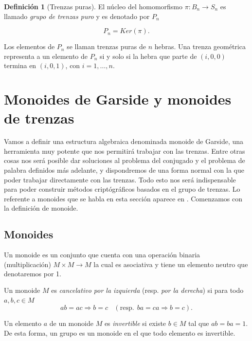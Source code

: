 \documentclass[12pt]{article}
\theoremstyle{definition}
\newtheorem{defi}{Definición}[section]
\begin{document}
\begin{defi}[Trenzas puras]
El núcleo del homomorfismo $\pi:B_n\rightarrow S_n$ es llamado \textit{grupo de trenzas puro} y es denotado por $P_n$

$$P_n = Ker(\pi).$$

Los elementos de $P_n$ se llaman trenzas puras de $n$ hebras. Una trenza geométrica representa a un elemento de $P_n$ si y solo si la hebra que parte de $(i,0,0)$ termina en $(i,0,1)$, con $i = 1,\ldots,n$.

\end{defi}


















\section{Monoides de Garside y monoides de trenzas}

Vamos a definir una estructura algebraica denominada monoide de Garside, una herramienta muy potente que nos permitirá trabajar con las trenzas. Entre otras cosas nos será posible dar soluciones al problema del conjugado y el problema de palabra definidos más adelante, y dispondremos de una forma normal con la que poder trabajar directamente con las trenzas. Todo esto nos será indispensable para poder construir métodos criptógráficos basados en el grupo de trenzas. Lo referente a monoides que se habla en esta sección aparece en \cite{br_gr}. Comenzamos con la definición de monoide.

\subsection{Monoides}

Un monoide es un conjunto que cuenta con una operación binaria (multiplicación) $M\times M \rightarrow M$ la cual es asociativa y tiene un elemento neutro que denotaremos por 1. 

Un monoide $M$ es \textit{cancelativo por la izquierda} (resp. \textit{por la derecha}) si para todo $a,b,c\in M$
$$ab=ac\Longrightarrow b=c\ \ \ \ (\textrm{resp.}\ \  ba=ca\Rightarrow b=c).$$

Un elemento $a$ de un monoide $M$ es \textit{invertible} si existe $b\in M$ tal que $ab=ba=1$. De esta forma, un grupo es un monoide en el que todo elemento es invertible.
\end{document}
